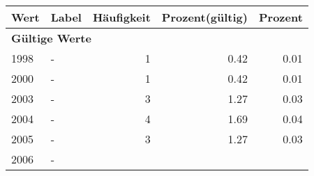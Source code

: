      \begin{longtable}{lXrrr}
     \toprule
     \textbf{Wert} & \textbf{Label} & \textbf{Häufigkeit} & \textbf{Prozent(gültig)} & \textbf{Prozent} \\
     \endhead
     \midrule
     \multicolumn{5}{l}{\textbf{Gültige Werte}}\\

     1998 &
     \multicolumn{1}{X}{ -  } &


       \num{1} &
       \num[round-mode=places,round-precision=2]{0,42} &
         \num[round-mode=places,round-precision=2]{0,01} \\

     2000 &
     \multicolumn{1}{X}{ -  } &


       \num{1} &
       \num[round-mode=places,round-precision=2]{0,42} &
         \num[round-mode=places,round-precision=2]{0,01} \\

     2003 &
     \multicolumn{1}{X}{ -  } &


       \num{3} &
       \num[round-mode=places,round-precision=2]{1,27} &
         \num[round-mode=places,round-precision=2]{0,03} \\

     2004 &
     \multicolumn{1}{X}{ -  } &


       \num{4} &
       \num[round-mode=places,round-precision=2]{1,69} &
         \num[round-mode=places,round-precision=2]{0,04} \\

     2005 &
     \multicolumn{1}{X}{ -  } &


       \num{3} &
       \num[round-mode=places,round-precision=2]{1,27} &
         \num[round-mode=places,round-precision=2]{0,03} \\

     2006 &
     \multicolumn{1}{X}{ -  } &



\end{longtable}
